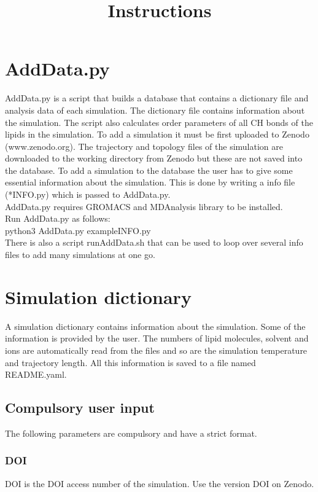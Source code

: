 \documentclass[12pt,a4paper]{article}
\date{}
\title{Instructions}
\begin{document}
\maketitle
\section*{AddData.py}
AddData.py is a script that builds a database that contains a dictionary file and analysis data of each simulation. The dictionary file contains information about the simulation. The script also calculates order parameters of all CH bonds of the lipids in the simulation. To add a simulation it must be first uploaded to Zenodo (www.zenodo.org). The trajectory and topology files of the simulation are downloaded to the working directory from Zenodo but these are not saved into the database. To add a simulation to the database the user has to give some essential information about the simulation. This is done by writing a info file (*INFO.py) which is passed to AddData.py. 
\newline \\
AddData.py requires GROMACS and MDAnalysis library to be installed.
\newline \\
Run AddData.py as follows:
\newline \\
python3 AddData.py exampleINFO.py
\newline \\
There is also a script runAddData.sh that can be used to loop over several info files to add many simulations at one go.



\section*{Simulation dictionary}
A simulation dictionary contains information about the simulation. Some of the information is provided by the user. The numbers of lipid molecules, solvent and ions are automatically read from the files and so are the simulation temperature and trajectory length. All this information is saved to a file named README.yaml.

\subsection*{Compulsory user input}
The following parameters are compulsory and have a strict format.

\subsubsection*{DOI}
DOI is the DOI access number of the simulation. Use the version DOI on Zenodo.
\end{document}
